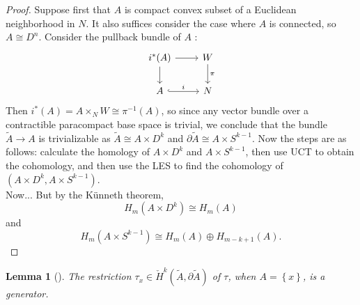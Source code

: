 \documentclass[reqno]{amsart}
\newtheorem{lemma}[theorem]{Lemma}
\theoremstyle{definition}
\theoremstyle{remark}
\begin{document}
\begin{proof}
    Suppose first that
    $A$ is compact convex subset
    of a Euclidean neighborhood in $N$. It also
    suffices consider the case where $A$ is connected,
    so $A \cong D^{n}$.
    Consider the pullback bundle of $A$ :
    \begin{equation*}
    \begin{tikzcd}
        i^{*}(A) \ar[r] \ar[d] & W \ar[d, "\pi"] \\
        A \ar[r, hookrightarrow, "i"] & N
    \end{tikzcd}
    \end{equation*}
    Then
    $i^{*}(A) =
    A \times_{N} W \cong
    \pi^{-1}(A)$, so
    since any vector bundle over a contractible paracompact
    base space is trivial, we conclude that 
    the bundle
    $\tilde{A} \to A$ is trivializable as
    $\tilde{A} \cong A \times D^{k}$ 
    and $\partial \tilde{A} \cong
    A \times S^{k-1}$.
    Now the steps are as follows: calculate
    the homology of 
    $A \times D^{k} $ and
    $A \times S^{k-1} $, then use UCT to obtain
    the cohomology, and then use the LES to find the cohomology
    of
    $\left( A \times D^{k}, A \times S^{k-1} \right) $.\\
    Now...
    But
    by the Künneth theorem,
    \[
    H_m(A \times D^{k}) \cong
    H_m(A)
    \] 
    and
    \[
    H_m(A \times S^{k-1}) \cong
    H_m(A) \oplus H_{m-k+1}(A).
    \] 
\end{proof}


\begin{lemma}[]\label{Lemma:NICVN}
    The restriction $\tau_x \in 
    \check{H}^{k}( \tilde{A}, \partial \tilde{A})$ of
    $\tau$, when $A = \left\{ x \right\} $, is a 
    generator.
\end{lemma}
\end{document}
